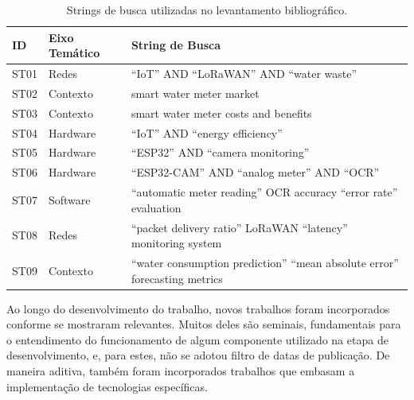 \begin{table}[H]
    \centering
    \caption{Strings de busca utilizadas no levantamento bibliográfico.}
    \label{tab:strings_busca}
    \begin{tabularx}{\textwidth}{@{}ll>{\raggedright\arraybackslash}X@{}}
    \toprule
    \textbf{ID} & \textbf{Eixo Temático} & \textbf{String de Busca} \\ \midrule
        ST01 & Redes & ``IoT'' AND ``LoRaWAN'' AND ``water waste'' \\
        ST02 & Contexto & smart water meter market \\
        ST03 & Contexto & smart water meter costs and benefits \\
        ST04 & Hardware & ``IoT'' AND ``energy efficiency'' \\
        ST05 & Hardware & ``ESP32'' AND ``camera monitoring'' \\
        ST06 & Hardware & ``ESP32-CAM'' AND ``analog meter'' AND ``OCR'' \\
        ST07 & Software & ``automatic meter reading'' OCR accuracy ``error rate'' evaluation \\
        ST08 & Redes & ``packet delivery ratio'' LoRaWAN ``latency'' monitoring system \\
        ST09 & Contexto & ``water consumption prediction'' ``mean absolute error'' forecasting metrics \\ \bottomrule
    \end{tabularx}
\end{table}

Ao longo do desenvolvimento do trabalho, novos trabalhos foram incorporados conforme se
mostraram relevantes. Muitos deles são seminais, fundamentais para o entendimento do
funcionamento de algum componente utilizado na etapa de desenvolvimento, e, para estes, não
se adotou filtro de datas de publicação. De maneira aditiva, também foram incorporados
trabalhos que embasam a implementação de tecnologias específicas.
